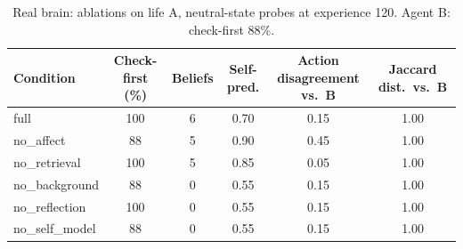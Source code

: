 \begin{table}[h]\centering\small
\caption{Real brain: ablations on life A, neutral-state probes at experience 120. Agent B: check-first 88\%.}
\label{tab:real_abl}
\begin{tabular}{lccccc}\toprule
Condition & Check-first (\%) & Beliefs & Self-pred. & Action disagreement vs.\ B & Jaccard dist.\ vs.\ B\\\midrule
full & 100 & 6 & 0.70 & 0.15 & 1.00\\
no\_affect & 88 & 5 & 0.90 & 0.45 & 1.00\\
no\_retrieval & 100 & 5 & 0.85 & 0.05 & 1.00\\
no\_background & 88 & 0 & 0.55 & 0.15 & 1.00\\
no\_reflection & 100 & 0 & 0.55 & 0.15 & 1.00\\
no\_self\_model & 88 & 0 & 0.55 & 0.15 & 1.00\\
\bottomrule\end{tabular}\end{table}
